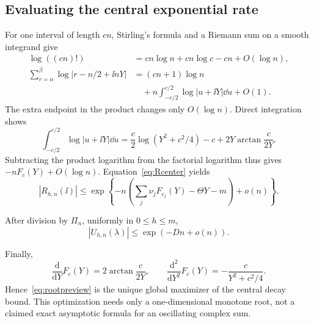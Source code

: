 \subsection{Evaluating the central exponential rate}

For one interval of length \(cn\), Stirling's formula and a Riemann
sum on a smooth integrand give
\begin{align*}
\log((cn)!)&=cn\log n+cn\log c-cn+O(\log n),\\
\sum_{r=\alpha}^{\beta}
\log|r-n/2+\ii nY|
&=(cn+1)\log n\\
&\quad+n\int_{-c/2}^{c/2}\log|u+\ii Y|\dd u+O(1).
\end{align*}
The extra endpoint in the product changes only \(O(\log n)\).
Direct integration shows
\[
\int_{-c/2}^{c/2}\log|u+\ii Y|\dd u
=\frac c2\log(Y^2+c^2/4)-c
+2Y\arctan\frac{c}{2Y}.
\]
Subtracting the product logarithm from the factorial logarithm
thus gives \(-nF_c(Y)+O(\log n)\).
Equation~\eqref{eq:Rcenter} yields
\[
|R_{h,n}(\ii)|\le
\exp\left\{-n\left(\sum_j\nu_jF_{c_j}(Y)
-\Theta Y-m\right)+o(n)\right\}.
\]

\begin{proposition}\label{prop:small}
After division by \(\Pi_n\), uniformly in \(0\le h\le m\),
\begin{equation}\label{eq:small}
|U_{h,n}(\lambda)|\le\exp(-Dn+o(n)).
\end{equation}
\end{proposition}

Finally,
\[
\frac{\mathrm d}{\mathrm dY}F_c(Y)
=2\arctan\frac{c}{2Y},\qquad
\frac{\mathrm d^2}{\mathrm dY^2}F_c(Y)
=-\frac{c}{Y^2+c^2/4}.
\]
Hence~\eqref{eq:rootpreview} is the unique global maximizer of
the central decay bound. This optimization needs only a
one-dimensional monotone root, not a claimed exact asymptotic
formula for an oscillating complex sum.
